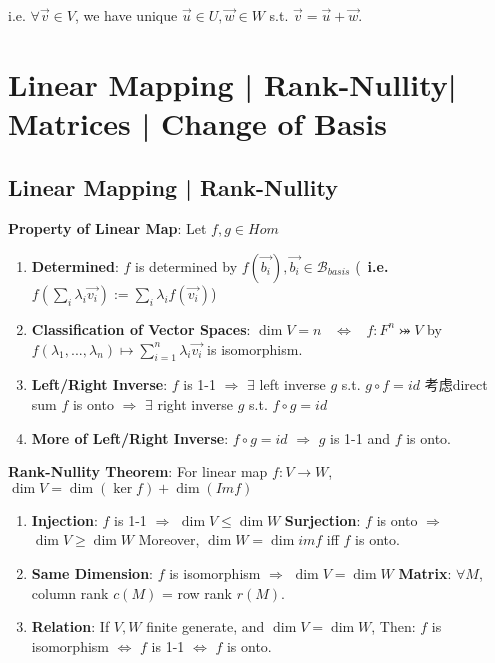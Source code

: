 \documentclass[9pt]{article}
\begin{document}
\quad \quad \quad \quad \quad \quad \quad \quad i.e. $\forall\vec{v}\in V$, we have unique $\vec{u}\in U,\vec{w}\in W$ s.t. $\vec{v}=\vec{u}+\vec{w}$. 


\section{Linear Mapping | Rank-Nullity| Matrices | Change of Basis }

\subsection{Linear Mapping | Rank-Nullity} %

\textbf{Property of Linear Map}: Let $f,g\in Hom$

\begin{enumerate}[itemsep=-2pt, topsep=-2pt]
    \item \textbf{Determined}: $f$ is determined by $f(\vec{b_i}),\vec{b_i}\in \mathcal{B}_{basis}$ {\footnotesize (\star \ \textbf{i.e.} $f(\sum_{i}\lambda_i\vec{v_i}):=\sum_{i}\lambda_if(\vec{v_i})$)}
    \item \textbf{Classification of Vector Spaces}: $\dim V=n$ \ $\Leftrightarrow$ \ $f:F^n\bij V$ by $f(\lambda_1,...,\lambda_n)\mapsto\sum_{i=1}^{n}\lambda_i\vec{v_i}$ is isomorphism.
    \item \textbf{Left/Right Inverse}: $f$ is 1-1 $\Rightarrow$ $\exists$ left inverse $g$ s.t. $g\circ f=id$ {\scriptsize 考虑direct sum} \quad \quad $f$ is onto $\Rightarrow$ $\exists$ right inverse $g$ s.t. $f\circ g=id$
    \item \np\textbf{More of Left/Right Inverse}: $f\circ g=id$ $\Rightarrow$ $g$ is 1-1 and $f$ is onto. 
\end{enumerate}

\textbf{Rank-Nullity Theorem}: For linear map $f:V\to W$, $\dim V=\dim(\ker f)+\dim(Im f)$ \quad \quad {}

\begin{enumerate}[itemsep=-2pt, topsep=-2pt]
    \item \textbf{Injection}: $f$ is 1-1 $\Rightarrow$ $\dim V \leq \dim W$ \quad \textbf{Surjection}: $f$ is onto $\Rightarrow$ $\dim V \geq \dim W$ \quad Moreover, $\dim W=\dim imf$ iff $f$ is onto.
    \item \textbf{Same Dimension}: {\small $f$ is isomorphism $\Rightarrow$ $\dim V=\dim W$} \quad \quad \quad \textbf{Matrix}: $\forall M$, column rank $c(M)$ = row rank $r(M)$.
    \item \textbf{Relation}: {\small If $V,W$ finite generate, and $\dim V=\dim W$, \quad Then: $f$ is isomorphism $\Leftrightarrow$ $f$ is 1-1 $\Leftrightarrow$ $f$ is onto.}
\end{enumerate}
\end{document}
